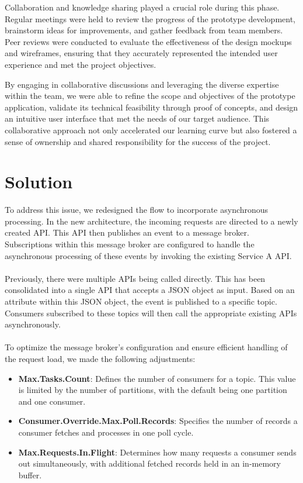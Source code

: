 \documentclass[12pt,a4paper]{report}
\begin{document}
Collaboration and knowledge sharing played a crucial role during this phase. Regular meetings were held to review the progress of the prototype development, brainstorm ideas for improvements, and gather feedback from team members. Peer reviews were conducted to evaluate the effectiveness of the design mockups and wireframes, ensuring that they accurately represented the intended user experience and met the project objectives.

By engaging in collaborative discussions and leveraging the diverse expertise within the team, we were able to refine the scope and objectives of the prototype application, validate its technical feasibility through proof of concepts, and design an intuitive user interface that met the needs of our target audience. This collaborative approach not only accelerated our learning curve but also fostered a sense of ownership and shared responsibility for the success of the project.


\section{Solution}

To address this issue, we redesigned the flow to incorporate asynchronous processing. In the new architecture, the incoming requests are directed to a newly created API. This API then publishes an event to a message broker. Subscriptions within this message broker are configured to handle the asynchronous processing of these events by invoking the existing Service A API.
\\\\
\noindent Previously, there were multiple APIs being called directly. This has been consolidated into a single API that accepts a JSON object as input. Based on an attribute within this JSON object, the event is published to a specific topic. Consumers subscribed to these topics will then call the appropriate existing APIs asynchronously.
\\\\
\noindent To optimize the message broker's configuration and ensure efficient handling of the request load, we made the following adjustments:

\begin{itemize}
    \item \textbf{Max.Tasks.Count}: Defines the number of consumers for a topic. This value is limited by the number of partitions, with the default being one partition and one consumer.
    \item \textbf{Consumer.Override.Max.Poll.Records}: Specifies the number of records a consumer fetches and processes in one poll cycle.
    \item \textbf{Max.Requests.In.Flight}: Determines how many requests a consumer sends out simultaneously, with additional fetched records held in an in-memory buffer.
\end{itemize}
\end{document}
